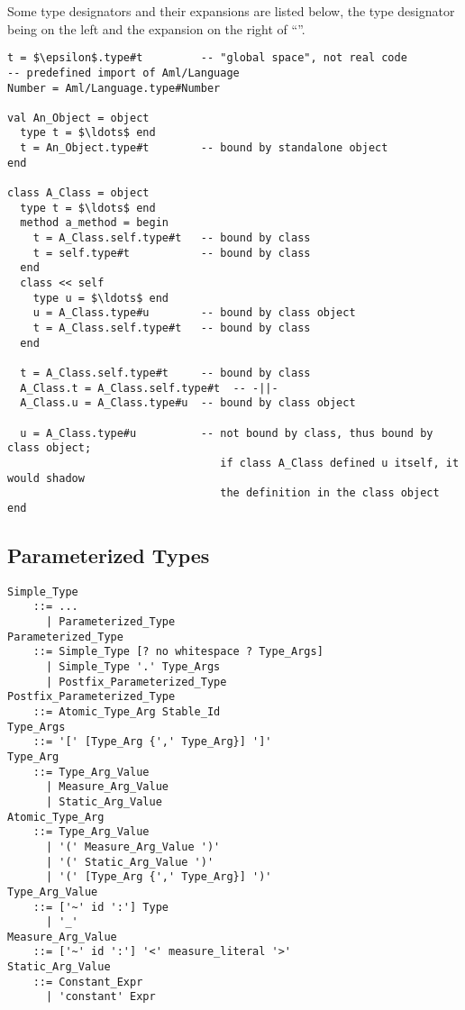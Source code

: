 \example Some type designators and their expansions are listed below, the type designator being on the left and the expansion on the right of ``\code{=}''. 
\begin{lstlisting}
t = $\epsilon$.type#t         -- "global space", not real code
-- predefined import of Aml/Language
Number = Aml/Language.type#Number 

val An_Object = object
  type t = $\ldots$ end
  t = An_Object.type#t        -- bound by standalone object
end

class A_Class = object
  type t = $\ldots$ end
  method a_method = begin
    t = A_Class.self.type#t   -- bound by class
    t = self.type#t           -- bound by class
  end
  class << self
    type u = $\ldots$ end
    u = A_Class.type#u        -- bound by class object
    t = A_Class.self.type#t   -- bound by class
  end
  
  t = A_Class.self.type#t     -- bound by class
  A_Class.t = A_Class.self.type#t  -- -||-
  A_Class.u = A_Class.type#u  -- bound by class object
  
  u = A_Class.type#u          -- not bound by class, thus bound by class object;
                                 if class A_Class defined u itself, it would shadow 
                                 the definition in the class object
end
\end{lstlisting}




\subsection{Parameterized Types}
\label{sec:parameterized-types}

\grammar\begin{lstlisting}
Simple_Type
    ::= ...
      | Parameterized_Type
Parameterized_Type
    ::= Simple_Type [? no whitespace ? Type_Args]
      | Simple_Type '.' Type_Args
      | Postfix_Parameterized_Type
Postfix_Parameterized_Type 
    ::= Atomic_Type_Arg Stable_Id
Type_Args 
    ::= '[' [Type_Arg {',' Type_Arg}] ']'
Type_Arg 
    ::= Type_Arg_Value
      | Measure_Arg_Value
      | Static_Arg_Value
Atomic_Type_Arg
    ::= Type_Arg_Value
      | '(' Measure_Arg_Value ')'
      | '(' Static_Arg_Value ')'
      | '(' [Type_Arg {',' Type_Arg}] ')'
Type_Arg_Value
    ::= ['~' id ':'] Type
      | '_'
Measure_Arg_Value 
    ::= ['~' id ':'] '<' measure_literal '>'
Static_Arg_Value
    ::= Constant_Expr
      | 'constant' Expr
\end{lstlisting}

